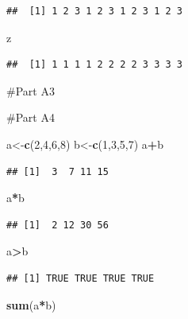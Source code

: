 \documentclass[
]{article}
\newenvironment{Shaded}{\begin{snugshade}}{\end{snugshade}}
\newcommand{\DecValTok}[1]{\textcolor[rgb]{0.00,0.00,0.81}{#1}}
\newcommand{\FunctionTok}[1]{\textcolor[rgb]{0.13,0.29,0.53}{\textbf{#1}}}
\newcommand{\NormalTok}[1]{#1}
\newcommand{\OtherTok}[1]{\textcolor[rgb]{0.56,0.35,0.01}{#1}}
\newcommand{\SpecialCharTok}[1]{\textcolor[rgb]{0.81,0.36,0.00}{\textbf{#1}}}
\begin{document}
\begin{verbatim}
##  [1] 1 2 3 1 2 3 1 2 3 1 2 3
\end{verbatim}

\begin{Shaded}
\begin{Highlighting}[]
\NormalTok{z}
\end{Highlighting}
\end{Shaded}

\begin{verbatim}
##  [1] 1 1 1 1 2 2 2 2 3 3 3 3
\end{verbatim}

\#Part A3

\#Part A4

\begin{Shaded}
\begin{Highlighting}[]
\NormalTok{a}\OtherTok{\textless{}{-}}\FunctionTok{c}\NormalTok{(}\DecValTok{2}\NormalTok{,}\DecValTok{4}\NormalTok{,}\DecValTok{6}\NormalTok{,}\DecValTok{8}\NormalTok{)}
\NormalTok{b}\OtherTok{\textless{}{-}}\FunctionTok{c}\NormalTok{(}\DecValTok{1}\NormalTok{,}\DecValTok{3}\NormalTok{,}\DecValTok{5}\NormalTok{,}\DecValTok{7}\NormalTok{)}
\NormalTok{a}\SpecialCharTok{+}\NormalTok{b}
\end{Highlighting}
\end{Shaded}

\begin{verbatim}
## [1]  3  7 11 15
\end{verbatim}

\begin{Shaded}
\begin{Highlighting}[]
\NormalTok{a}\SpecialCharTok{*}\NormalTok{b}
\end{Highlighting}
\end{Shaded}

\begin{verbatim}
## [1]  2 12 30 56
\end{verbatim}

\begin{Shaded}
\begin{Highlighting}[]
\NormalTok{a}\SpecialCharTok{\textgreater{}}\NormalTok{b}
\end{Highlighting}
\end{Shaded}

\begin{verbatim}
## [1] TRUE TRUE TRUE TRUE
\end{verbatim}

\begin{Shaded}
\begin{Highlighting}[]
\FunctionTok{sum}\NormalTok{(a}\SpecialCharTok{*}\NormalTok{b)}
\end{Highlighting}
\end{Shaded}
\end{document}
